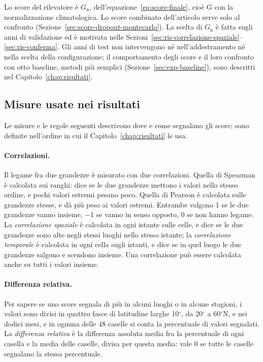 Lo score del rilevatore è $G_{\mathrm{n}}$, dell'equazione~\eqref{eq:score-finale}, cioè G con la normalizzazione climatologica. Lo score combinato dell'articolo serve solo al confronto (Sezione~\ref{sec:score-dropout-montecarlo}). La scelta di $G_{\mathrm{n}}$ è fatta sugli anni di validazione ed è motivata nelle Sezioni~\ref{sec:ris-correlazione-spaziale}--\ref{sec:ris-conferma}. Gli anni di test non intervengono né nell'addestramento né nella scelta della configurazione; il comportamento degli score e il loro confronto con otto baseline, metodi più semplici (Sezione~\ref{sec:exp-baseline}), sono descritti nel Capitolo~\ref{chap:risultati}.

\subsection{Misure usate nei risultati}
\label{sec:exp-misure}

Le misure e le regole seguenti descrivono dove e come segnalano gli score; sono definite nell'ordine in cui il Capitolo~\ref{chap:risultati} le usa.

\paragraph{Correlazioni.} Il legame fra due grandezze è misurato con due correlazioni. Quella di Spearman è calcolata sui ranghi: dice se le due grandezze mettono i valori nello stesso ordine, e pochi valori estremi pesano poco. Quella di Pearson è calcolata sulle grandezze stesse, e dà più peso ai valori estremi. Entrambe valgono 1 se le due grandezze vanno insieme, $-1$ se vanno in senso opposto, 0 se non hanno legame. La \emph{correlazione spaziale} è calcolata in ogni istante sulle celle, e dice se le due grandezze sono alte negli stessi luoghi nello stesso istante; la \emph{correlazione temporale} è calcolata in ogni cella sugli istanti, e dice se in quel luogo le due grandezze salgono e scendono insieme. Una correlazione può essere calcolata anche su tutti i valori insieme.

\paragraph{Differenza relativa.} Per sapere se uno score segnala di più in alcuni luoghi o in alcune stagioni, i valori sono divisi in quattro fasce di latitudine larghe 10$^\circ$, da 20$^\circ$ a 60$^\circ$N, e nei dodici mesi, e in ognuna delle 48 caselle si conta la percentuale di valori segnalati. La \emph{differenza relativa} è la differenza assoluta media fra la percentuale di ogni casella e la media delle caselle, divisa per questa media: vale 0 se tutte le caselle segnalano la stessa percentuale.

